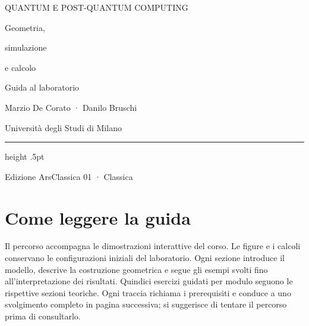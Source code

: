 \begin{titlepage}
\vspace*{9mm}
{\sffamily\fontsize{10}{13}\selectfont\color{Accent}
 QUANTUM E POST-QUANTUM COMPUTING\par}
\vspace{18mm}
{\sffamily\fontsize{32}{37}\selectfont\color{Accent}
 Geometria,\par simulazione\par e calcolo\par}
\vspace{8mm}
{\sffamily\fontsize{15}{19}\selectfont Guida al laboratorio\par}
\vspace{3mm}
{\sffamily\fontsize{10}{13}\selectfont\color{Ink!65}\GuidaSelezione\par}
\vspace{12mm}
\vfill
{\fontsize{11}{14}\selectfont Marzio De Corato · Danilo Bruschi\par}
{\sffamily\small\color{Ink!65}Università degli Studi di Milano\par}
\vspace{5mm}
{\color{Accent!35}\hrule height .5pt}
\vspace{3mm}
{\sffamily\footnotesize\color{Ink!60}Edizione ArsClassica 01 · Classica\par}
\end{titlepage}
\section*{Come leggere la guida}
Il percorso accompagna le dimostrazioni interattive del corso. Le figure e i
calcoli conservano le configurazioni iniziali del laboratorio. Ogni sezione
introduce il modello, descrive la costruzione geometrica e segue gli esempi
svolti fino all’interpretazione dei risultati. Quindici esercizi guidati per
modulo seguono le rispettive sezioni teoriche. Ogni traccia richiama i
prerequisiti e conduce a uno svolgimento completo in pagina successiva;
si suggerisce di tentare il percorso prima di consultarlo.

